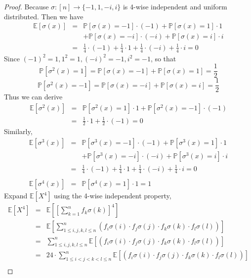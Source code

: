 \begin{proof}
				Because $\sigma: [n] \rightarrow \{-1, 1, -i, i\}$ is 4-wise independent and uniform distributed. Then we have 
				\begin{eqnarray*}
					\mathbb{E}[\sigma(x)] &= &\mathbb{P}[\sigma(x) = -1] \cdot (-1) + \mathbb{P}[\sigma(x) = 1] \cdot 1\\ 
					&& + \mathbb{P}[\sigma(x) = -i] \cdot (-i) + \mathbb{P}[\sigma(x) = i] \cdot i\\
					&= &\frac{1}{4} \cdot (-1) + \frac{1}{4} \cdot 1 + \frac{1}{4} \cdot (-i) + \frac{1}{4} \cdot i = 0
				\end{eqnarray*}
				Since $(-1)^2 = 1, 1^2 = 1, (-i)^2 = -1, i^2 = -1$, so that 
				\[\mathbb{P}[\sigma^2(x) = 1] = \mathbb{P}[\sigma(x) = -1] + \mathbb{P}[\sigma(x) = 1] = \frac{1}{2}\]
				\[\mathbb{P}[\sigma^2(x) = -1] = \mathbb{P}[\sigma(x) = -i] + \mathbb{P}[\sigma(x) = i] = \frac{1}{2}\]
				Thus we can derive
				\begin{eqnarray*}
					\mathbb{E}[\sigma^2(x)] &= &\mathbb{P}[\sigma^2(x) = 1] \cdot 1 + \mathbb{P}[\sigma^2(x) = -1] \cdot (-1)\\ 
					&= &\frac{1}{2} \cdot 1 + \frac{1}{2} \cdot (-1)=0
				\end{eqnarray*}
 				Similarly, 
 				\begin{eqnarray*}
					\mathbb{E}[\sigma^3(x)] &= &\mathbb{P}[\sigma^3(x) = -1] \cdot (-1) + \mathbb{P}[\sigma^3(x) = 1] \cdot 1\\ 
					&& + \mathbb{P}[\sigma^3(x) = -i] \cdot (-i) + \mathbb{P}[\sigma^3(x) = i] \cdot i\\
					&= &\frac{1}{4} \cdot (-1) + \frac{1}{4} \cdot 1 + \frac{1}{4} \cdot (-i) + \frac{1}{4} \cdot i = 0\\\\
					\mathbb{E}[\sigma^4(x)] &= &\mathbb{P}[\sigma^4(x) = 1] \cdot 1 = 1
				\end{eqnarray*}
				Expand $\mathbb{E}[X^4]$ using the 4-wise independent property,
				\begin{eqnarray*}
					\mathbb{E}[X^4] &= &\mathbb{E}[[\sum_{k=1}^n f_k \sigma(k)]^4]\\
					&= &\mathbb{E}[\sum_{1 \leq i, j ,k, l \leq n}^n (f_i \sigma(i) \cdot f_j \sigma(j) \cdot f_k \sigma(k) \cdot f_l \sigma(l))]\\
					&= &\sum_{1 \leq i, j ,k, l \leq n}^n\mathbb{E}[(f_i \sigma(i) \cdot f_j \sigma(j) \cdot f_k \sigma(k) \cdot f_l \sigma(l))]\\
					&= &24\cdot\sum_{1 \leq i< j < k < l \leq n}^n\mathbb{E}[(f_i \sigma(i) \cdot f_j \sigma(j) \cdot f_k \sigma(k) \cdot f_l \sigma(l))]\\

\end{eqnarray*}
\end{proof}
